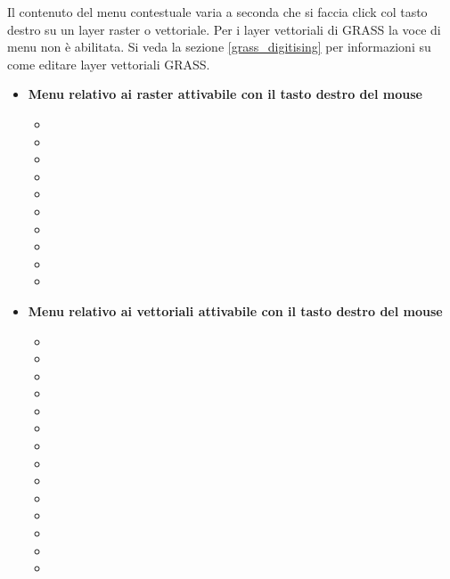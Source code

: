 Il contenuto del menu contestuale varia a seconda che si faccia click col tasto destro
su un layer raster o vettoriale. Per i layer vettoriali di GRASS la voce di menu 
non è abilitata. Si veda la sezione \ref{grass_digitising} per informazioni su come
editare layer vettoriali GRASS. 

\begin{itemize}

\item \textbf{Menu relativo ai raster attivabile con il tasto destro del mouse}
\begin{itemize}
\item {}
\item {}
\item {}
\item {}
\item {}
\item {}
\item {}
\item {}
\item {}
\item {}
\end{itemize}

\item \textbf{Menu relativo ai vettoriali attivabile con il tasto destro del mouse}
\begin{itemize}
\item {}
\item {}
\item {}
\item {}
\item {}
\item {}
\item {}
\item {}
\item {}
\item {}
\item {}
\item {}
\item {}
\item {}
\end{itemize}


\end{itemize}
